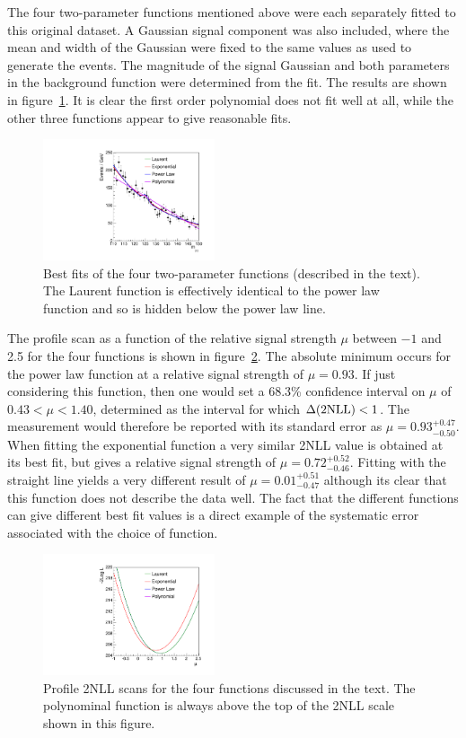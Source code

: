 The four two-parameter functions mentioned above were each 
separately fitted to this
original dataset. A Gaussian signal component was also included, where the
mean and width of the Gaussian were fixed to the same values as used to
generate the events.
The magnitude of the signal Gaussian and both parameters in the
background function were determined from the fit.
The results are shown in figure~\ref{fig:functions:bestfits}.
It is clear the first order polynomial does not fit well at all, while the 
other three functions appear to give reasonable fits.
%
\begin{figure}[tbp]
\centering
\includegraphics[width=0.45\textwidth]{functions/BestFits.pdf}
\caption{Best fits of the four two-parameter functions (described in the
text). The Laurent function is effectively identical to the power law function
and so is hidden below the power law line.}
\label{fig:functions:bestfits}
\end{figure}

The profile scan as a function of the relative signal strength $\mu$
between $-1$ and 2.5
for the four functions is shown in
figure~\ref{fig:functions:profiles}.
The absolute minimum occurs for the power law function at a relative signal 
strength of $\mu = 0.93$. If just considering this function,
then one would set a 68.3\% confidence interval on $\mu$ of  
$0.43 < \mu < 1.40 $, determined as the interval for which $\Delta({\rm 2NLL}) < 1$. 
The measurement would therefore be reported with its standard error as $\mu=0.93^{+0.47}_{-0.50}$.
When fitting the exponential function a very similar 2NLL value is obtained
at its best fit, but gives a relative signal strength of $\mu = 0.72^{+0.52}_{-0.46}$.
Fitting with the straight line yields a very different result of $\mu = 0.01^{+0.51}_{-0.47}$ 
although its clear that this function does not describe the data well.
The fact that the different functions can give different best fit values
is a direct example of the systematic error associated
with the choice of function.
%
\begin{figure}[tbp]
\centering
\includegraphics[width=0.45\textwidth]{functions/Profiles.pdf}
\caption{Profile 2NLL scans for the four functions discussed in the text.
The polynominal function is always above the top of the 2NLL scale shown in this
figure. }
\label{fig:functions:profiles}
\end{figure}

